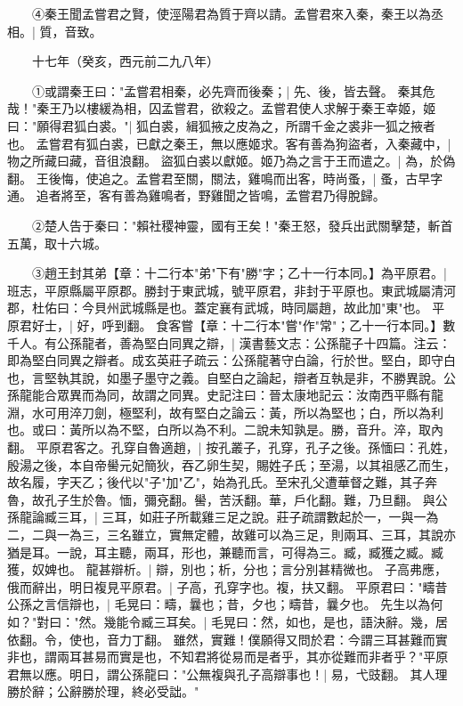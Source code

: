 　　④秦王聞孟嘗君之賢，使涇陽君為質于齊以請。孟嘗君來入秦，秦王以為丞相。|{
	質，音致。
	}

　　十七年（癸亥，西元前二九八年）

　　①或謂秦王曰："孟嘗君相秦，必先齊而後秦；|{
	先、後，皆去聲。
	}
秦其危哉！"秦王乃以樓緩為相，囚孟嘗君，欲殺之。孟嘗君使人求解于秦王幸姬，姬曰："願得君狐白裘。"|{
	狐白裘，緝狐掖之皮為之，所謂千金之裘非一狐之掖者也。
	}
孟嘗君有狐白裘，已獻之秦王，無以應姬求。客有善為狗盜者，入秦藏中，|{
	物之所藏曰藏，音徂浪翻。
	}
盜狐白裘以獻姬。姬乃為之言于王而遣之。|{
	為，於偽翻。
	}
王後悔，使追之。孟嘗君至關，關法，雞鳴而出客，時尚蚤，|{
	蚤，古早字通。
	}
追者將至，客有善為雞鳴者，野雞聞之皆鳴，孟嘗君乃得脫歸。

　　②楚人告于秦曰："賴社稷神靈，國有王矣！"秦王怒，發兵出武關擊楚，斬首五萬，取十六城。

　　③趙王封其弟【章：十二行本"弟"下有"勝"字；乙十一行本同。】為平原君。|{
	班志，平原縣屬平原郡。勝封于東武城，號平原君，非封于平原也。東武城屬清河郡，杜佑曰：今貝州武城縣是也。蓋定襄有武城，時同屬趙，故此加"東"也。
	}
平原君好士，|{
	好，呼到翻。
	}
食客嘗【章：十二行本"嘗"作"常"；乙十一行本同。】數千人。有公孫龍者，善為堅白同異之辯，|{
	漢書藝文志：公孫龍子十四篇。注云：即為堅白同異之辯者。成玄英莊子疏云：公孫龍著守白論，行於世。堅白，即守白也，言堅執其說，如墨子墨守之義。自堅白之論起，辯者互執是非，不勝異說。公孫龍能合眾異而為同，故謂之同異。史記注曰：晉太康地記云：汝南西平縣有龍淵，水可用淬刀劍，極堅利，故有堅白之論云：黃，所以為堅也；白，所以為利也。或曰：黃所以為不堅，白所以為不利。二說未知孰是。勝，音升。淬，取內翻。
	}
平原君客之。孔穿自魯適趙，|{
	按孔叢子，孔穿，孔子之後。孫愐曰：孔姓，殷湯之後，本自帝嚳元妃簡狄，吞乙卵生契，賜姓子氏；至湯，以其祖感乙而生，故名履，字天乙；後代以"子"加"乙"，始為孔氏。至宋孔父遭華督之難，其子奔魯，故孔子生於魯。愐，彌兗翻。嚳，苦沃翻。華，戶化翻。難，乃旦翻。
	}
與公孫龍論臧三耳，|{
	三耳，如莊子所載雞三足之說。莊子疏謂數起於一，一與一為二，二與一為三，三名雖立，實無定體，故雞可以為三足，則兩耳、三耳，其說亦猶是耳。一說，耳主聽，兩耳，形也，兼聽而言，可得為三。臧，臧獲之臧。臧獲，奴婢也。
	}
龍甚辯析。|{
	辯，別也；析，分也；言分別甚精微也。
	}
子高弗應，俄而辭出，明日複見平原君。|{
	子高，孔穿字也。複，扶又翻。
	}
平原君曰："疇昔公孫之言信辯也，|{
	毛晃曰：疇，曩也；昔，夕也；疇昔，曩夕也。
	}
先生以為何如？"對曰："然。幾能令臧三耳矣。|{
	毛晃曰：然，如也，是也，語決辭。幾，居依翻。令，使也，音力丁翻。
	}
雖然，實難！僕願得又問於君：今謂三耳甚難而實非也，謂兩耳甚易而實是也，不知君將從易而是者乎，其亦從難而非者乎？"平原君無以應。明日，謂公孫龍曰："公無複與孔子高辯事也！|{
	易，弋豉翻。
	}
其人理勝於辭；公辭勝於理，終必受詘。"

